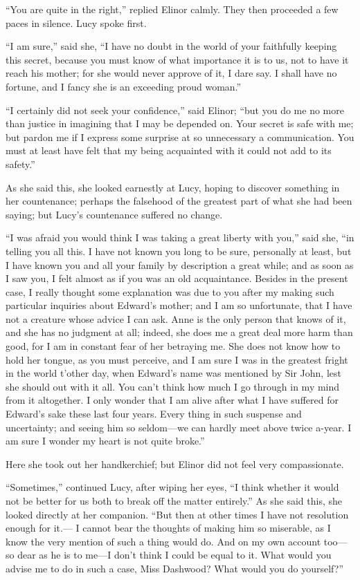 ``You are quite in the right,'' replied Elinor calmly.
They then proceeded a few paces in silence.  Lucy spoke first.

``I am sure,'' said she, ``I have no doubt in the world
of your faithfully keeping this secret, because you must
know of what importance it is to us, not to have it reach
his mother; for she would never approve of it, I dare say.
I shall have no fortune, and I fancy she is an exceeding
proud woman.''

``I certainly did not seek your confidence,'' said Elinor;
``but you do me no more than justice in imagining that I
may be depended on.  Your secret is safe with me;
but pardon me if I express some surprise at so unnecessary
a communication.  You must at least have felt that my
being acquainted with it could not add to its safety.''

As she said this, she looked earnestly at Lucy,
hoping to discover something in her countenance; perhaps the
falsehood of the greatest part of what she had been saying;
but Lucy's countenance suffered no change.

``I was afraid you would think I was taking a great
liberty with you,'' said she, ``in telling you all this.
I have not known you long to be sure, personally at least,
but I have known you and all your family by description
a great while; and as soon as I saw you, I felt almost as if
you was an old acquaintance.  Besides in the present case,
I really thought some explanation was due to you after my
making such particular inquiries about Edward's mother;
and I am so unfortunate, that I have not a creature whose
advice I can ask.  Anne is the only person that knows of it,
and she has no judgment at all; indeed, she does me a great
deal more harm than good, for I am in constant fear of her
betraying me.  She does not know how to hold her tongue,
as you must perceive, and I am sure I was in the greatest
fright in the world t'other day, when Edward's name was
mentioned by Sir John, lest she should out with it all.
You can't think how much I go through in my mind from
it altogether.  I only wonder that I am alive after what
I have suffered for Edward's sake these last four years.
Every thing in such suspense and uncertainty; and seeing
him so seldom---we can hardly meet above twice a-year.
I am sure I wonder my heart is not quite broke.''

Here she took out her handkerchief; but Elinor did
not feel very compassionate.

``Sometimes,'' continued Lucy, after wiping her eyes,
``I think whether it would not be better for us both
to break off the matter entirely.''  As she said this,
she looked directly at her companion.  ``But then
at other times I have not resolution enough for it.---%
I cannot bear the thoughts of making him so miserable,
as I know the very mention of such a thing would do.
And on my own account too---so dear as he is to me---I don't
think I could be equal to it.  What would you advise
me to do in such a case, Miss Dashwood?  What would you
do yourself?''

